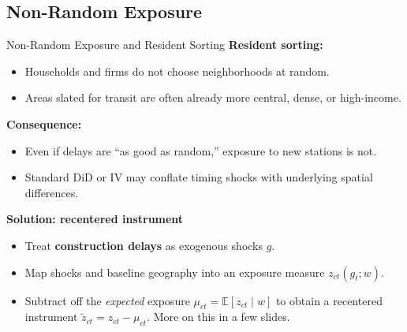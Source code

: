 \documentclass{beamer}
\begin{document}
\subsection{Non-Random Exposure}
\begin{frame}{Non-Random Exposure and Resident Sorting}
\small
\textbf{Resident sorting:}
\begin{itemize}
    \item Households and firms do not choose neighborhoods at random.
    \item Areas slated for transit are often already more central, dense, or high-income.
\end{itemize}

\medskip
\textbf{Consequence:}
\begin{itemize}
    \item Even if delays are “as good as random,” exposure to new stations is not.
    \item Standard DiD or IV may conflate timing shocks with underlying spatial differences.
\end{itemize}

\medskip
\textbf{Solution: \citeauthor{borusyak_nonrandom_2023} recentered instrument}
\begin{itemize}
    \item Treat \textbf{construction delays} as exogenous shocks $g$.
    \item Map shocks and baseline geography into an exposure measure $z_{ct}(g_t; w)$.
    \item Subtract off the \emph{expected} exposure $\mu_{ct} = \mathbb{E}[z_{ct} \mid w]$ to obtain a recentered instrument $\tilde{z}_{ct} = z_{ct} - \mu_{ct}$. More on this in a few slides. 
\end{itemize}
\end{frame}
\end{document}
